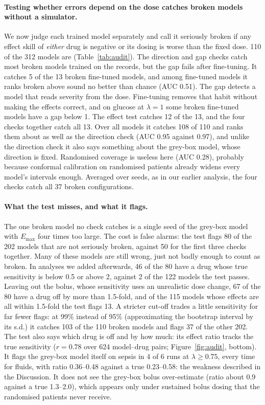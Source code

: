 \documentclass[letterpaper]{article}
\newcommand{\Emax}{E_{\max}}
\begin{document}
\paragraph{Testing whether errors depend on the dose catches broken models without a simulator.} We now judge each trained model separately and call it seriously broken if any effect skill of \emph{either} drug is negative or its dosing is worse than the fixed dose. 110 of the 312 models are (Table~\ref{tab:audit}). The direction and gap checks catch most broken models trained on the records, but the gap fails after fine-tuning. It catches 5 of the 13 broken fine-tuned models, and among fine-tuned models it ranks broken above sound no better than chance (AUC 0.51). The gap detects a model that reads severity from the dose. Fine-tuning removes that habit without making the effects correct, and on glucose at $\lambda=1$ some broken fine-tuned models have a gap below 1. The effect test catches 12 of the 13, and the four checks together catch all 13. Over all models it catches 108 of 110 and ranks them about as well as the direction check (AUC 0.95 against 0.97), and unlike the direction check it also says something about the grey-box model, whose direction is fixed. Randomised coverage is useless here (AUC 0.28), probably because conformal calibration on randomised patients already widens every model's intervals enough. Averaged over seeds, as in our earlier analysis, the four checks catch all 37 broken configurations.

\paragraph{What the test misses, and what it flags.} The one broken model no check catches is a single seed of the grey-box model with $\Emax$ four times too large. The cost is false alarms: the test flags 80 of the 202 models that are not seriously broken, against 50 for the first three checks together. Many of these models are still wrong, just not badly enough to count as broken. In analyses we added afterwards, 46 of the 80 have a drug whose true sensitivity is below 0.5 or above 2, against 2 of the 122 models the test passes. Leaving out the bolus, whose sensitivity uses an unrealistic dose change, 67 of the 80 have a drug off by more than 1.5-fold, and of the 115 models whose effects are all within 1.5-fold the test flags 13. A stricter cut-off trades a little sensitivity for far fewer flags: at 99\% instead of 95\% (approximating the bootstrap interval by its s.d.) it catches 103 of the 110 broken models and flags 37 of the other 202. The test also says which drug is off and by how much: its effect ratio tracks the true sensitivity ($r=0.78$ over 624 model--drug pairs; Figure~\ref{fig:audit}, bottom). It flags the grey-box model itself on sepsis in 4 of 6 runs at $\lambda\ge0.75$, every time for fluids, with ratio 0.36--0.48 against a true 0.23--0.58: the weakness described in the Discussion. It does not see the grey-box bolus over-estimate (ratio about 0.9 against a true 1.3--2.0), which appears only under sustained bolus dosing that the randomised patients never receive.
\end{document}
